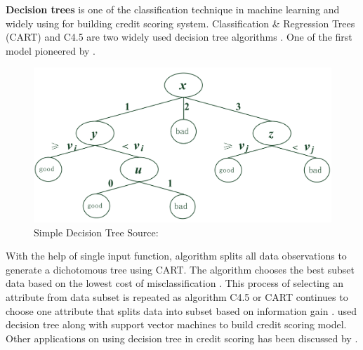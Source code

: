{\textbf{Decision trees} is one of the classification technique in machine learning and widely using for building credit scoring system. Classification \& Regression Trees (CART) and C4.5 are two widely used decision tree algorithms \citep{kohavi2002data}. One of the first model pioneered by \cite{breiman1984classification}.
\begin{figure}
\includegraphics[width=\textwidth]{simpledt.png}
\caption{Simple Decision Tree 
Source: \citep{zhang2010vertical}}
\end{figure}
With the help of single input function, algorithm splits all data observations to generate a dichotomous tree using CART.  The algorithm chooses the best subset data based on the lowest cost of misclassification \citep{zekic2004small}. This process of selecting an attribute from data subset is repeated as algorithm C4.5 or CART continues to choose one attribute that splits data into subset based on information gain \citep{zhou2008new}. \citet{huang2007credit} used decision tree along with support vector machines to build credit scoring model. Other applications on using decision tree in credit scoring has been discussed by \citep{xia2017boosted,koh2015two,koutanaei2015hybrid}.\\


}
